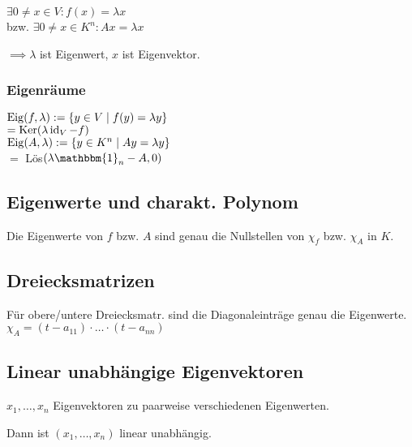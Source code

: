 $\exists 0\neq x\in V: f(x)=\lambda x$ \\
bzw. $\exists 0\neq x\in K^n: Ax = \lambda x$

$\implies \lambda$ ist Eigenwert, $x$ ist Eigenvektor.

\subsubsection*{Eigenräume}
$\operatorname{Eig}(f,\lambda) := \{y\in V \mid f(y)=\lambda y\}$ \\
$=\operatorname{Ker}(\lambda \operatorname{id}_V - f)$ \\
$\operatorname{Eig}(A,\lambda) := \{y\in K^n \mid Ay=\lambda y\}$ \\
$=$ Lös$(\lambda\mathbbm{1}_n - A, 0)$

\subsection*{Eigenwerte und charakt. Polynom}
Die Eigenwerte von $f$ bzw. $A$ sind genau die Nullstellen von $\chi_f$ bzw. $\chi_A$ in $K$.

\subsection*{Dreiecksmatrizen}
Für obere/untere Dreiecksmatr. sind die Diagonaleinträge genau die Eigenwerte.
$\chi_A=(t-a_{11})\cdot\dots\cdot(t-a_{nn})$

\subsection*{Linear unabhängige Eigenvektoren}
$x_1,\dots,x_n$ Eigenvektoren zu paarweise verschiedenen Eigenwerten.

Dann ist $(x_1,\dots,x_n)$ linear unabhängig.
